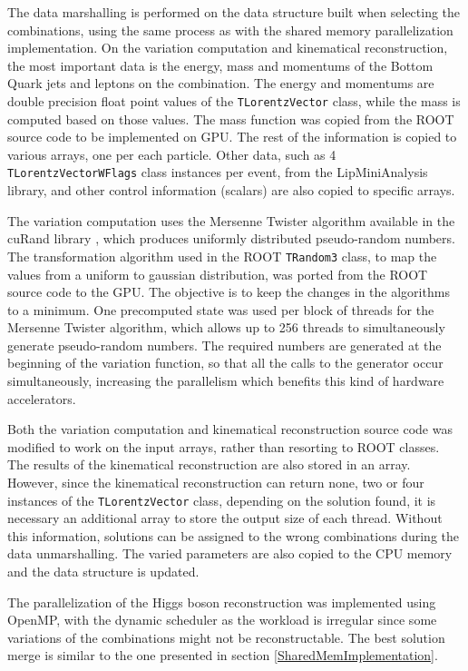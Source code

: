 The data marshalling is performed on the data structure built when selecting the combinations, using the same process as with the shared memory parallelization implementation. On the variation computation and kinematical reconstruction, the most important data is the energy, mass and momentums of the Bottom Quark jets and leptons on the combination. The energy and momentums are double precision float point values of the \texttt{TLorentzVector} class, while the mass is computed based on those values. The mass function was copied from the ROOT source code to be implemented on GPU. The rest of the information is copied to various arrays, one per each particle. Other data, such as 4 \texttt{TLorentzVectorWFlags} class instances per event, from the LipMiniAnalysis library, and other control information (scalars) are also copied to specific arrays.

The variation computation uses the Mersenne Twister algorithm available in the \nvidia cuRand library \cite{NVIDIA:cuRand}, which produces uniformly distributed pseudo-random numbers. The transformation algorithm used in the ROOT \texttt{TRandom3} class, to map the values from a uniform to gaussian distribution, was ported from the ROOT source code to the GPU. The objective is to keep the changes in the \ttDilepKinFit algorithms to a minimum. One precomputed state was used per block of threads for the Mersenne Twister algorithm, which allows up to 256 threads to simultaneously generate pseudo-random numbers. The required numbers are generated at the beginning of the variation function, so that all the calls to the generator occur simultaneously, increasing the parallelism which benefits this kind of hardware accelerators.

Both the variation computation and kinematical reconstruction source code was modified to work on the input arrays, rather than resorting to ROOT classes. The results of the kinematical reconstruction are also stored in an array. However, since the kinematical reconstruction can return none, two or four instances of the \texttt{TLorentzVector} class, depending on the solution found, it is necessary an additional array to store the output size of each thread. Without this information, solutions can be assigned to the wrong combinations during the data unmarshalling. The varied parameters are also copied to the CPU memory and the data structure is updated.

The parallelization of the Higgs boson reconstruction was implemented using OpenMP, with the dynamic scheduler as the workload is irregular since some variations of the combinations might not be reconstructable. The best solution merge is similar to the one presented in section \ref{SharedMemImplementation}.

